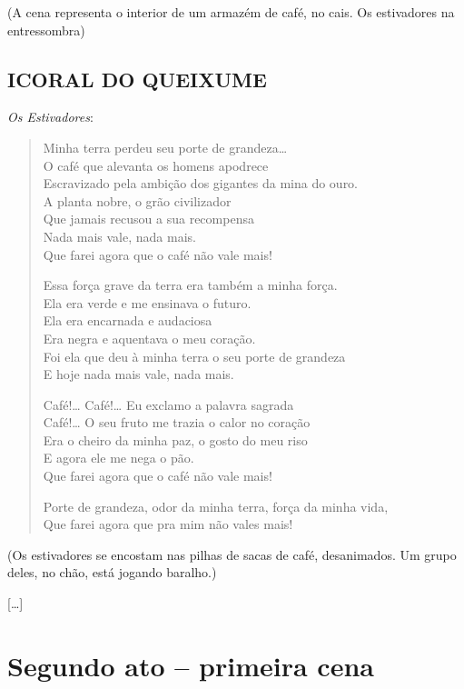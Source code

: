 {\hfill\parbox{150pt}{(A cena representa o interior
de um armazém de café, no cais.
Os estivadores na entressombra)}

\section*{I\break CORAL DO QUEIXUME}

\emph{Os Estivadores}:

\begin{verse}
Minha terra perdeu seu porte de grandeza\ldots{}\\
O café que alevanta os homens apodrece\\
Escravizado pela ambição dos gigantes da mina do ouro.\\
A planta nobre, o grão civilizador\\
Que jamais recusou a sua recompensa\\
Nada mais vale, nada mais.\\
Que farei agora que o café não vale mais!

Essa força grave da terra era também a minha força.\\
Ela era verde e me ensinava o futuro.\\
Ela era encarnada e audaciosa\\
Era negra e aquentava o meu coração.\\
Foi ela que deu à minha terra o seu porte de grandeza\\
E hoje nada mais vale, nada mais.

Café!\ldots{} Café!\ldots{} Eu exclamo a palavra sagrada\\
Café!\ldots{} O seu fruto me trazia o calor no coração\\
Era o cheiro da minha paz, o gosto do meu riso\\
E agora ele me nega o pão.\\
Que farei agora que o café não vale mais!

Porte de grandeza, odor da minha terra, força da minha vida,\\
Que farei agora que pra mim não vales mais!
\end{verse}

\hfill\parbox{150pt}{(Os estivadores se encostam nas pilhas
de sacas de café, desanimados. Um grupo
deles, no chão, está jogando baralho.)}

{[}\ldots{}{]}

\chapter{Segundo ato -- primeira cena}

}
